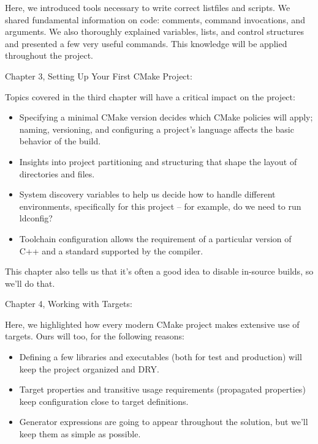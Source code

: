 Here, we introduced tools necessary to write correct listfiles and scripts. We shared fundamental information on code: comments, command invocations, and arguments. We also thoroughly explained variables, lists, and control structures and presented a few very useful commands. This knowledge will be applied throughout the project.

Chapter 3, Setting Up Your First CMake Project:

Topics covered in the third chapter will have a critical impact on the project:

\begin{itemize}
\item 
Specifying a minimal CMake version decides which CMake policies will apply; naming, versioning, and configuring a project's language affects the basic behavior of the build.

\item 
Insights into project partitioning and structuring that shape the layout of directories and files.

\item 
System discovery variables to help us decide how to handle different environments, specifically for this project – for example, do we need to run ldconfig?

\item 
Toolchain configuration allows the requirement of a particular version of C++ and a standard supported by the compiler.
\end{itemize}

This chapter also tells us that it's often a good idea to disable in-source builds, so we'll do that.

Chapter 4, Working with Targets: 

Here, we highlighted how every modern CMake project makes extensive use of targets. Ours will too, for the following reasons:

\begin{itemize}
\item 
Defining a few libraries and executables (both for test and production) will keep the project organized and DRY.

\item 
Target properties and transitive usage requirements (propagated properties) keep configuration close to target definitions.

\item 
Generator expressions are going to appear throughout the solution, but we'll keep them as simple as possible.
\end{itemize}

